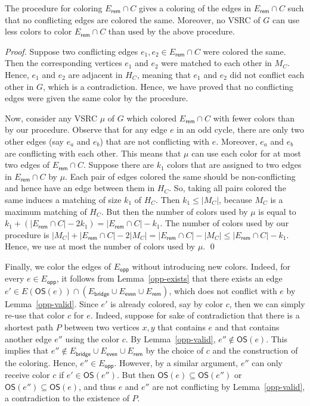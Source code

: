 \documentclass[letter,runningheads,envcountsame,envcountsect]{llncs}
\newcommand{\cvsrc}{VSRC}
\newcommand{\et}{E_{\mathsf{bridge}}}
\newcommand{\eeven}{E_{\mathsf{even}}}
\newcommand{\eopp}{E_{\mathsf{opp}}}
\newcommand{\erem}{E_{\mathsf{rem}}}
\newcommand{\vopp}{\mathsf{vopp}}
\newcommand{\os}{\mathsf{OS}}
\newcommand{\subg}{\mathsf{S}}
\begin{document}
\begin{lemma}
	\label{erem-procedure}
The procedure for coloring $\erem \cap C$ gives a coloring of the edges in $\erem\cap C$ such that no conflicting edges are colored the same. Moreover, no {\cvsrc} of $G$ can use less colors to color $\erem\cap C$ than used by the above procedure.
\end{lemma}
\begin{proof}
Suppose two conflicting edges $e_1, e_2 \in \erem \cap C$ were colored the same. Then the corresponding vertices $e_1$ and $e_2$ were matched to each other in $M_C$. Hence, $e_1$ and $e_2$ are adjacent in $H_C$, meaning that $e_1$ and $e_2$ did not conflict each other in $G$, which is a contradiction. Hence, we have proved that no conflicting edges were given the same color by the procedure. 

Now, consider any VSRC $\mu$ of $G$ which colored $\erem\cap C$ with fewer colors than by our procedure. Observe that for any edge $e$ in an odd cycle, there are only two other edges (say $e_a$ and $e_b$) that are not conflicting with $e$. Moreover, $e_a$ and $e_b$ are conflicting with each other. This means that $\mu$ can use each color for at most two edges of $\erem\cap C$. Suppose there are $k_1$ colors that are assigned to two edges in $\erem\cap C$ by $\mu$. Each pair of edges colored the same should be non-conflicting and hence have an edge between them in $H_C$. So, taking all pairs colored the same induces a matching of size $k_1$ of $H_C$. Then $k_1\le |M_C|$, because $M_C$ is a maximum matching of $H_C$. But then the number of colors used by $\mu$ is equal to $k_1+(|\erem\cap C|-2k_1)=|\erem\cap C|-k_1$. The number of colors used by our procedure is $|M_C|+|\erem\cap C|-2|M_C|=|\erem\cap C|-|M_C|\le |\erem\cap C|-k_1$. Hence, we use at most the number of colors used by $\mu$.
\qed\end{proof}


Finally, we color the edges of $\eopp$ without introducing new colors. Indeed, for every $e \in \eopp$, it follows from Lemma~\ref{opp-exists} that there exists an edge $e'\in E(\os(e))\cap \left( \et\cup\eeven\cup \erem \right)$, which does not conflict with $e$ by Lemma~\ref{opp-valid}. Since $e'$ is already colored, say by color $c$, then we can simply re-use that color $c$ for $e$. Indeed, suppose for sake of contradiction that there is a shortest path $P$ between two vertices $x,y$ that contains $e$ and that contains another edge $e''$ using the color $c$. By Lemma~\ref{opp-valid}, $e'' \not\in \os(e)$. This implies that $e'' \not\in \et \cup \eeven \cup \erem$ by the choice of $c$ and the construction of the coloring. Hence, $e'' \in \eopp$. However, by a similar argument, $e''$ can only receive color $c$ if $e' \in \os(e'')$. But then $\os(e) \subseteq \os(e'')$ or $\os(e'') \subseteq \os(e)$, and thus $e$ and $e''$ are not conflicting by Lemma~\ref{opp-valid}, a contradiction to the existence of $P$.
\end{document}
